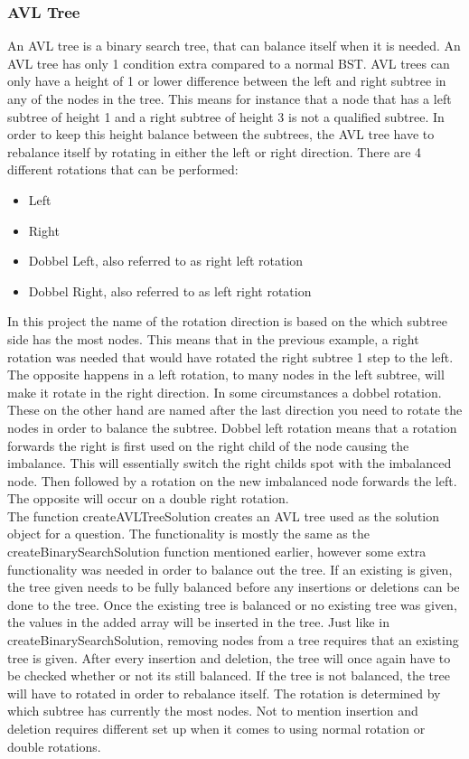 \subsubsection{AVL Tree}
An AVL tree is a binary search tree, that can balance itself when it is needed. An AVL tree has only 1 condition extra compared to a normal BST. AVL trees can only have a height of 1 or lower difference between the left and right subtree in any of the nodes in the tree. This means for instance that a node that has a left subtree of height 1 and a right subtree of height 3 is not a qualified subtree. In order to keep this height balance between the subtrees, the AVL tree have to rebalance itself by rotating in either the left or right direction. There are 4 different rotations that can be performed:
\begin{itemize}
	\item{Left}
	\item{Right}
	\item{Dobbel Left, also referred to as right left rotation}
	\item{Dobbel Right, also referred to as left right rotation}
\end{itemize}
In this project the name of the rotation direction is based on the which subtree side has the most nodes. This means that in the previous example, a right rotation was needed that would have rotated the right subtree 1 step to the left. The opposite happens in a left rotation, to many nodes in the left subtree, will make it rotate in the right direction. In some circumstances a dobbel rotation. These on the other hand are named after the last direction you need to rotate the nodes in order to balance the subtree. Dobbel left rotation means that a rotation forwards the right is first used on the right child of the node causing the imbalance. This will essentially switch the right childs spot with the imbalanced node. Then followed by a rotation on the new imbalanced node forwards the left. The opposite will occur on a double right rotation.
\\[11pt]
The function createAVLTreeSolution creates an AVL tree used as the solution object for a question. The functionality is mostly the same as the createBinarySearchSolution function mentioned earlier, however some extra functionality was needed in order to balance out the tree. If an existing is given, the tree given needs to be fully balanced before any insertions or deletions can be done to the tree. Once the existing tree is balanced or no existing tree was given, the values in the added array will be inserted in the tree. Just like in createBinarySearchSolution, removing nodes from a tree requires that an existing tree is given. After every insertion and deletion, the tree will once again have to be checked whether or not its still balanced. If the tree is not balanced, the tree will have to rotated in order to rebalance itself. The rotation is determined by which subtree has currently the most nodes. Not to mention insertion and deletion requires different set up when it comes to using normal rotation or double rotations.

